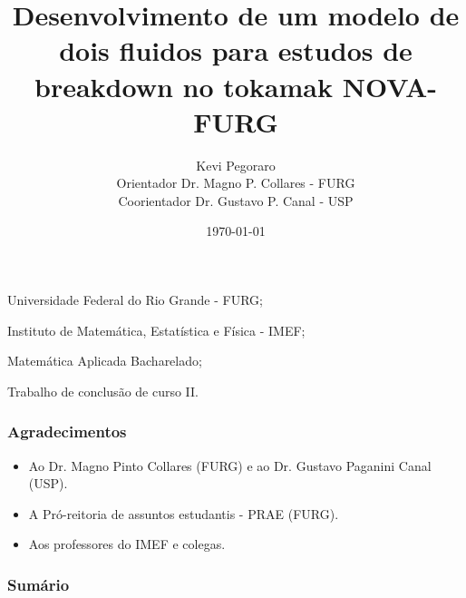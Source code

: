\documentclass[aspectratio=169]{beamer}
\begin{document}
	\title[TCC 2]{Desenvolvimento de um modelo de dois fluidos para estudos de breakdown no tokamak NOVA-FURG}
	\author[kevipegoraro@hotmail.com]{Kevi Pegoraro \\
	 Orientador Dr. Magno P. Collares - FURG\\
	 Coorientador Dr. Gustavo P. Canal - USP}
	\date[2019]{\today}
	
	\begin{frame}
		\titlepage
	\end{frame}
	\begin{frame}
      
\begin{LARGE}

\begin{center}
  Universidade Federal do Rio Grande - FURG;
  
  Instituto de Matemática, Estatística e Física - IMEF;
  
   Matemática Aplicada Bacharelado;

  Trabalho de conclusão de curso II.
\end{center}
\end{LARGE}
	\end{frame}

\begin{frame}
		\frametitle{Agradecimentos}
\begin{LARGE}
		\begin{itemize}
		\item Ao Dr. Magno Pinto Collares (FURG) e ao Dr. Gustavo Paganini Canal (USP).
        \item A Pró-reitoria de assuntos estudantis - PRAE (FURG).		
		\item Aos professores do IMEF e colegas. 
		\end{itemize}
\end{LARGE}
\end{frame}	
	
	\begin{frame}
		\frametitle{Sum\'{a}rio}
		\tableofcontents%
	\end{frame}
	
\end{document}
